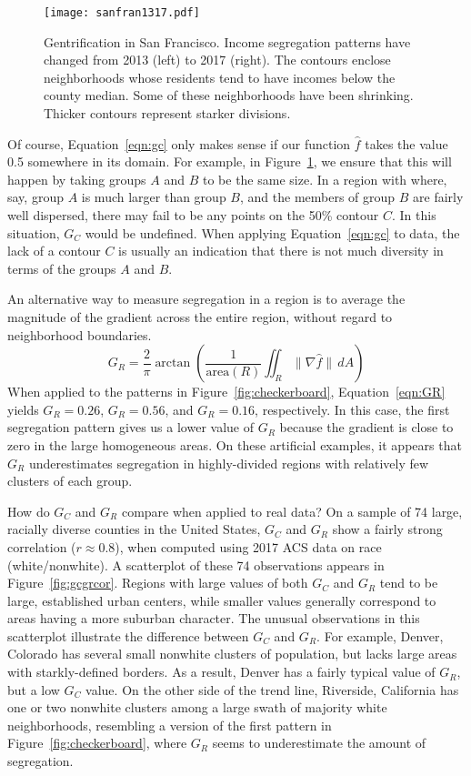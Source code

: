 \documentclass{article}
\theoremstyle{theorem}
\theoremstyle{definition}
\begin{document}
\begin{figure}
  \texttt{[image: sanfran1317.pdf]} %
  \caption{Gentrification in San Francisco. Income segregation patterns have changed from 2013 (left) to 2017 (right). The contours enclose neighborhoods whose residents tend to have incomes below the county median. Some of these neighborhoods have been shrinking. Thicker contours represent starker divisions.}
  \label{fig:sanfran1317}
\end{figure}

Of course, Equation~\ref{eqn:gc} only makes sense if our function $\hat{f}$ takes the value 0.5 somewhere in its domain. For example, in Figure~\ref{fig:sanfran1317}, we ensure that this will happen by taking groups $A$ and $B$ to be the same size. In a region with where, say, group $A$ is much larger than group $B$, and the members of group $B$ are fairly well dispersed, there may fail to be any points on the 50\% contour $C$. In this situation, $G_C$ would be undefined. When applying Equation~\ref{eqn:gc} to data, the lack of a contour $C$ is usually an indication that there is not much diversity in terms of the groups $A$ and $B$.

An alternative way to measure segregation in a region is to average the magnitude of the gradient across the entire region, without regard to neighborhood boundaries.
\begin{equation}\label{eqn:GR}
   G_R = \frac{2}{\pi} \arctan \left(\frac{1}{\mathrm{area}(R)} \iint_R \lVert \nabla \hat{f} \rVert \, dA \right)
\end{equation}
When applied to the patterns in Figure~\ref{fig:checkerboard}, Equation~\ref{eqn:GR} yields $G_R = 0.26$, $G_R = 0.56$, and $G_R = 0.16$, respectively. In this case, the first segregation pattern gives us a lower value of $G_R$ because the gradient is close to zero in the large homogeneous areas. On these artificial examples, it appears that $G_R$ underestimates segregation in highly-divided regions with relatively few clusters of each group.

How do $G_C$ and $G_R$ compare when applied to real data? On a sample of 74 large, racially diverse counties in the United States, $G_C$ and $G_R$ show a fairly strong correlation ($r \approx 0.8$), when computed using 2017 ACS data on race (white/nonwhite). A scatterplot of these 74 observations appears in Figure~\ref{fig:gcgrcor}. Regions with large values of both $G_C$ and $G_R$ tend to be large, established urban centers, while smaller values generally correspond to areas having a more suburban character. The unusual observations in this scatterplot illustrate the difference between $G_C$ and $G_R$. For example, Denver, Colorado has several small nonwhite clusters of population, but lacks large areas with starkly-defined borders. As a result, Denver has a fairly typical value of $G_R$, but a low $G_C$ value. On the other side of the trend line, Riverside, California has one or two nonwhite clusters among a large swath of majority white neighborhoods, resembling a version of the first pattern in Figure~\ref{fig:checkerboard}, where $G_R$ seems to underestimate the amount of segregation.
\end{document}
